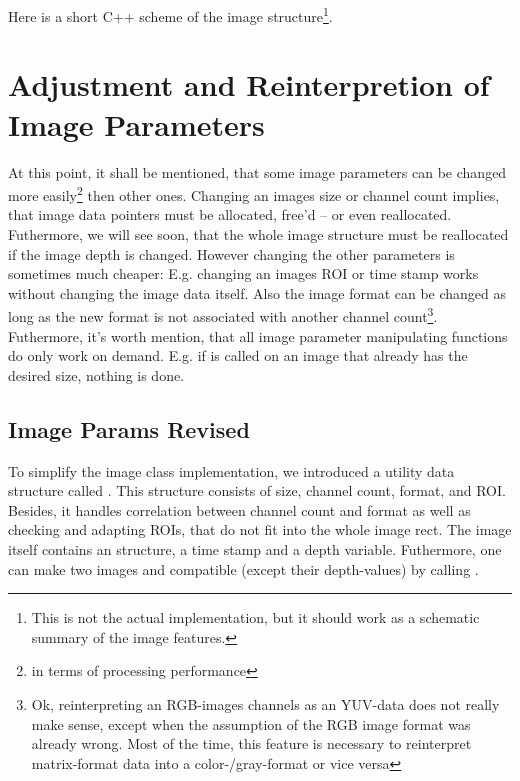 Here is a short C++ scheme of the image structure\footnote{This is not the actual implementation, but it should work as a schematic summary of the image features.}.



\section {Adjustment and Reinterpretion of Image Parameters}
At this point, it shall be mentioned, that some image parameters can be changed more easily\footnote{in terms of processing performance} then other ones. Changing an images size or channel count implies, that image data pointers must be allocated, free'd -- or even reallocated. Futhermore, we will see soon, that the whole image structure must be reallocated if the image depth is changed. However changing the other parameters is sometimes much cheaper: E.g. changing an images ROI or time stamp works without changing the image data itself. Also the image format can be changed as long as the new format is not associated with another channel count\footnote{Ok, reinterpreting an RGB-images channels as an YUV-data does not really make sense, except when the assumption of the RGB image format was already wrong. Most of the time, this feature is necessary to reinterpret matrix-format data into a color-/gray-format or vice versa}.\\
Futhermore, it's worth mention, that all image parameter manipulating functions do only work on demand. E.g. if  is called on an image that already has the desired size, nothing is done.


\subsection {Image Params Revised}
To simplify the image class implementation, we introduced a utility data structure called  . This structure consists of size, channel count, format, and ROI. Besides, it handles correlation between channel count and format as well as checking and adapting ROIs, that do not fit into the whole image rect. The image itself contains an  structure, a time stamp and a depth variable. Futhermore, one can make two images  and  compatible (except their depth-values) by calling .



